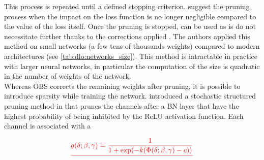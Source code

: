 This process \DIFdelbegin {}\DIFdelend is repeated until a defined stopping criterion.
\citeauthor{DBLP:conf/nips/HassibiS92} suggest \DIFdelbegin {}\DIFdelend \DIFaddbegin {}\DIFaddend the pruning process when
the impact on the loss function is no longer negligible compared to the value of
the loss itself. Once the pruning is stopped, \DIFdelbegin {}\DIFdelend \DIFaddbegin {}\DIFaddend can be used
as is \DIFdelbegin {}\DIFdelend \DIFaddbegin {}\DIFaddend do not necessitate further \DIFdelbegin {}\DIFdelend \DIFaddbegin {}\DIFaddend thanks to the corrections
applied \DIFdelbegin \DIFdel{(}%
\DIFdel{)}\DIFdelend \DIFaddbegin {}\DIFaddend . The authors applied this method \DIFdelbegin {}\DIFdelend \DIFaddbegin {}\DIFaddend on
small networks (a few tens of thousands \DIFaddbegin {}\DIFaddend weights) compared to modern
architectures (see \cref{tab:dlo:networks_size}). This method is intractable in
practice with larger neural networks, in particular the computation of the
\DIFdelbegin {}\DIFdelend \DIFaddbegin {}\DIFaddend size is quadratic in the number of weights of the
network.\\

Whereas \ac{OBS} corrects the remaining weights after pruning, it is possible to
introduce sparsity while training the network.
\citeauthor{DBLP:conf/icml/KangH20} introduced a stochastic structured pruning
method in \cite{DBLP:conf/icml/KangH20} that prunes the channels after a \ac{BN}
layer that have the highest probability of being inhibited by the \ac{ReLU}
activation function. Each channel is associated with a \DIFdelbegin {}%

\begin{displaymath}
  \DIFdel{q(\delta;\beta,\gamma) = \frac{1}{1 +\exp ( - k (\Phi(\delta;\beta,\gamma)-c))}
}\end{displaymath}%

